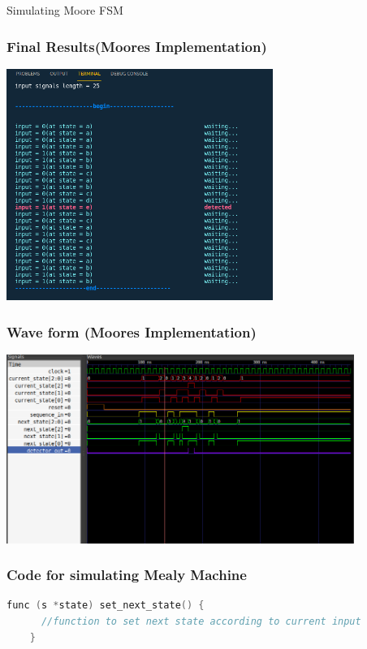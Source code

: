 \documentclass[xcolor=table]{beamer}
\begin{document}
\begin{frame}{Simulating Moore FSM}
\end{frame}

\begin{frame}
  \frametitle{Final Results(Moores Implementation)}
  \centering
  \includegraphics[width=0.65\textwidth, height=0.85\textheight]{./static/sim_res_moore.png}
\end{frame}

\begin{frame}
  \frametitle{Wave form (Moores Implementation)}
  \centering
  \includegraphics[width=0.85\textwidth, height=0.65\textheight]{./static/res_wave_moore.png}
\end{frame}

  \begin{frame}[fragile]
  \frametitle{Code for simulating Mealy Machine}
  \begin{lstlisting}[language=C,keywordstyle=\bf,stringstyle=\it]
    func (s *state) set_next_state() {
      //function to set next state according to current input
    }
    
  \end{lstlisting}

\end{frame} 
\end{document}

